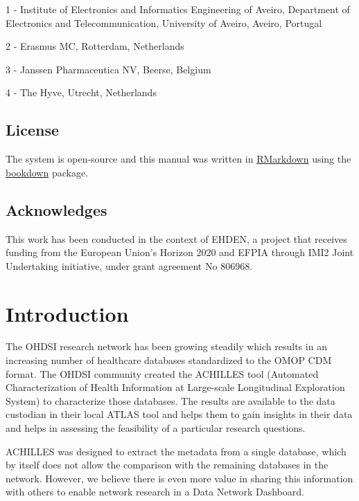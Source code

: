 \documentclass[]{book}
\begin{document}
1 - Institute of Electronics and Informatics Engineering of Aveiro,
Department of Electronics and Telecommunication, University of Aveiro,
Aveiro, Portugal

2 - Erasmus MC, Rotterdam, Netherlands

3 - Janssen Pharmaceutica NV, Beerse, Belgium

4 - The Hyve, Utrecht, Netherlands

\section*{License}\label{license}

The system is open-source and this manual was written in
\href{https://rmarkdown.rstudio.com}{RMarkdown} using the
\href{https://bookdown.org}{bookdown} package.

\section*{Acknowledges}\label{acknowledges}

This work has been conducted in the context of EHDEN, a project that
receives funding from the European Union's Horizon 2020 and EFPIA
through IMI2 Joint Undertaking initiative, under grant agreement No
806968.

\chapter{Introduction}\label{introduction}

The OHDSI research network has been growing steadily which results in an
increasing number of healthcare databases standardized to the OMOP CDM
format. The OHDSI community created the ACHILLES tool (Automated
Characterization of Health Information at Large-scale Longitudinal
Exploration System) to characterize those databases. The results are
available to the data custodian in their local ATLAS tool and helps them
to gain insights in their data and helps in assessing the feasibility of
a particular research questions.

ACHILLES was designed to extract the metadata from a single database,
which by itself does not allow the comparison with the remaining
databases in the network. However, we believe there is even more value
in sharing this information with others to enable network research in a
Data Network Dashboard.
\end{document}
